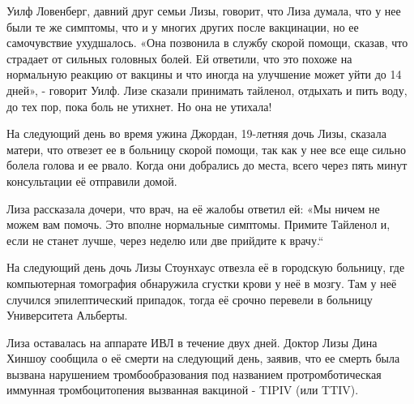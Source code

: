 Уилф Ловенберг, давний друг семьи Лизы, говорит, что Лиза думала, что у нее были
те же симптомы, что и у многих других после вакцинации, но ее самочувствие
ухудшалось. «Она позвонила в службу скорой помощи, сказав, что страдает от
сильных головных болей. Ей ответили, что это похоже на нормальную реакцию от
вакцины и что иногда на улучшение может уйти до 14 дней», - говорит Уилф. Лизе
сказали принимать тайленол, отдыхать и пить воду, до тех пор, пока боль не
утихнет. Но она не утихала!

На следующий день во время ужина Джордан, 19-летняя дочь Лизы, сказала матери,
что отвезет ее в больницу скорой помощи, так как у нее все еще сильно болела
голова и ее рвало. Когда они добрались до места, всего через пять минут
консультации её отправили домой.

Лиза рассказала дочери, что врач, на её жалобы ответил ей: «Мы ничем не можем
вам помочь. Это вполне нормальные симптомы. Примите Тайленол и, если не станет
лучше, через неделю или две прийдите к врачу.“

На следующий день дочь Лизы Стоунхаус отвезла её в городскую больницу, где
компьютерная томография обнаружила сгустки крови у неё в мозгу. Там у неё
случился эпилептический припадок, тогда её срочно перевели в больницу
Университета Альберты.

Лиза оставалась на аппарате ИВЛ в течение двух дней. Доктор Лизы Дина Хиншоу
сообщила о её смерти на следующий день, заявив, что ее смерть была вызвана
нарушением тромбообразования под названием протромботическая иммунная
тромбоцитопения вызванная вакциной - TIPIV (или TTIV).

